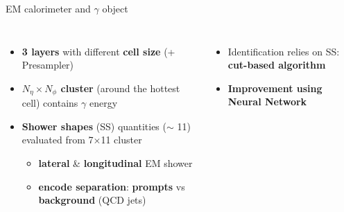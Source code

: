\begin{frame}{EM calorimeter and $\gamma$ object}
\begin{columns}
\begin{itemize}
    \item \textcolor{structurColor}{\textbf{3 layers}} with different \textbf{cell size} (+ Presampler)
    \item \textbf{$N_{\eta}\times N_{\phi}$ cluster} (around the hottest cell) contains $\gamma$ energy
    \pause
    \item \textcolor{HHturquoise_d}{\textbf{Shower shapes}} (SS) quantities ($\sim$ 11) evaluated from 7$\times$11 cluster
    \begin{itemize}
        \item \textbf{lateral} \& \textbf{longitudinal} EM shower
        \item \textbf{encode separation}: \textcolor{HHred}{\textbf{prompts}} vs \textcolor{HHblue}{\textbf{background}} (QCD jets)
    \end{itemize}
\end{itemize}
\pause
\begin{itemize}
    \item Identification relies on SS: \textbf{cut-based algorithm}
    \item \textcolor{HHred}{\textbf{Improvement using Neural Network}}
\end{itemize}
\end{columns} 
\end{frame}

